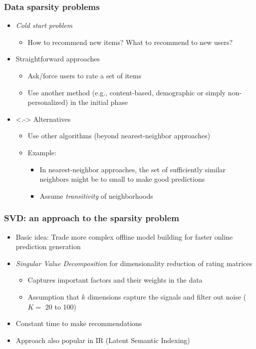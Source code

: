 \documentclass{beamer}
\begin{document}
\begin{frame}
    \frametitle{Data sparsity problems}
    \begin{itemize}
    \item<+-> \emph{Cold start problem}
        \begin{itemize}
        \item How to recommend new items? What to recommend to new users?
        \end{itemize}
    \item<+-> Straightforward approaches
        \begin{itemize}
        \item Ask/force users to rate a set of items
        \item Use another method (e.g., content-based, demographic or simply
            non-personalized) in the initial phase
        \end{itemize}
    \item<.-> Alternatives
        \begin{itemize}
        \item Use other algorithms (beyond nearest-neighbor approaches)
        \item Example:
            \begin{itemize}
            \item In nearest-neighbor approaches, the set of sufficiently
                similar neighbors might be to small to make good predictions
            \item Assume \emph{transitivity} of neighborhoods
            \end{itemize}
        \end{itemize}
    \end{itemize}
\end{frame}

\begin{frame}
    \frametitle{SVD: an approach to the sparsity problem}
    \begin{itemize}
    \item Basic idea: Trade more complex offline model building for faster
        online prediction generation
    \item \emph{Singular Value Decomposition} for dimensionality reduction of
        rating matrices
        \begin{itemize}
        \item Captures important factors and their weights in the data
        \item Assumption that $k$ dimensions capture the signals and filter out
            noise ($K =$ 20 to 100)
        \end{itemize}
    \item Constant time to make recommendations
    \item Approach also popular in IR (Latent Semantic Indexing)%
    \end{itemize}
\end{frame}
\end{document}
